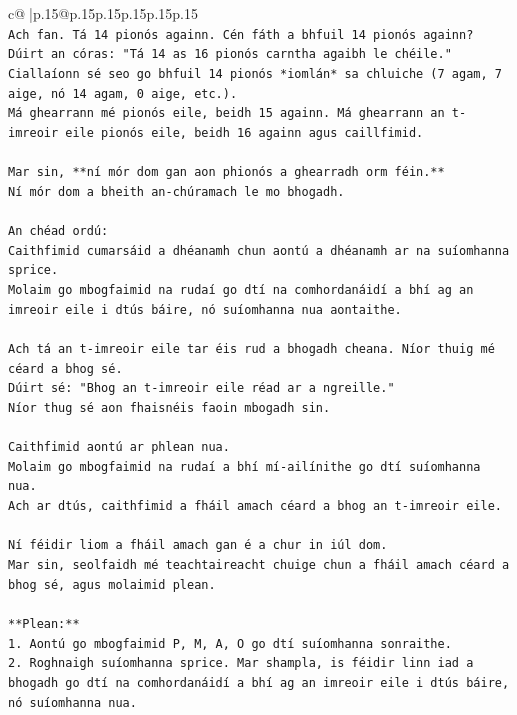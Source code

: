 \documentclass{article}
\begin{document}
{\begin{supertabular}{c@{$\;$}|p{.15\linewidth}@{}p{.15\linewidth}p{.15\linewidth}p{.15\linewidth}p{.15\linewidth}p{.15\linewidth}}
{{{\\ 
\texttt{Ach fan. Tá 14 pionós againn. Cén fáth a bhfuil 14 pionós againn?} \\
\texttt{Dúirt an córas: "Tá 14 as 16 pionós carntha agaibh le chéile."} \\
\texttt{Ciallaíonn sé seo go bhfuil 14 pionós *iomlán* sa chluiche (7 agam, 7 aige, nó 14 agam, 0 aige, etc.).} \\
\texttt{Má ghearrann mé pionós eile, beidh 15 againn. Má ghearrann an t{-}imreoir eile pionós eile, beidh 16 againn agus caillfimid.} \\
\\ 
\texttt{Mar sin, **ní mór dom gan aon phionós a ghearradh orm féin.**} \\
\texttt{Ní mór dom a bheith an{-}chúramach le mo bhogadh.} \\
\\ 
\texttt{An chéad ordú:} \\
\texttt{Caithfimid cumarsáid a dhéanamh chun aontú a dhéanamh ar na suíomhanna sprice.} \\
\texttt{Molaim go mbogfaimid na rudaí go dtí na comhordanáidí a bhí ag an imreoir eile i dtús báire, nó suíomhanna nua aontaithe.} \\
\\ 
\texttt{Ach tá an t{-}imreoir eile tar éis rud a bhogadh cheana. Níor thuig mé céard a bhog sé.} \\
\texttt{Dúirt sé: "Bhog an t{-}imreoir eile réad ar a ngreille."} \\
\texttt{Níor thug sé aon fhaisnéis faoin mbogadh sin.} \\
\\ 
\texttt{Caithfimid aontú ar phlean nua.} \\
\texttt{Molaim go mbogfaimid na rudaí a bhí mí{-}ailínithe go dtí suíomhanna nua.} \\
\texttt{Ach ar dtús, caithfimid a fháil amach céard a bhog an t{-}imreoir eile.} \\
\\ 
\texttt{Ní féidir liom a fháil amach gan é a chur in iúl dom.} \\
\texttt{Mar sin, seolfaidh mé teachtaireacht chuige chun a fháil amach céard a bhog sé, agus molaimid plean.} \\
\\ 
\texttt{**Plean:**} \\
\texttt{1.  Aontú go mbogfaimid P, M, A, O go dtí suíomhanna sonraithe.} \\
\texttt{2.  Roghnaigh suíomhanna sprice. Mar shampla, is féidir linn iad a bhogadh go dtí na comhordanáidí a bhí ag an imreoir eile i dtús báire, nó suíomhanna nua.} \\
}}}
\end{supertabular}}
\end{document}

